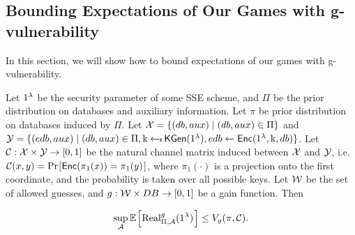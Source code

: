 \subsection{Bounding Expectations of Our Games with g-vulnerability}
In this section, we will show how to bound expectations of our games with g-vulnerability.

\begin{theorem}
	\normalfont
	Let $1^{\lambda}$ be the security parameter of some SSE scheme, and $\Pi$ be the prior distribution on databases and auxiliary information. Let $\pi$ be prior distribution on databases induced by $\Pi$. Let $\mathcal{X} = \{ (db, aux) \mid (db, aux) \in \Pi \}$ and $\mathcal{Y} = \{(edb, aux) \mid (db, aux) \in \Pi, \text{k} \hskip2.3pt{\gets\!\!\mbox{\tiny${\$}$\normalsize}}\, \mathsf{KGen}(1^{\lambda}), edb \gets \mathsf{Enc}(1^{\lambda}, \text{k}, db) \}$. Let $\mathcal{C}: \mathcal{X} \times \mathcal{Y} \rightarrow [0,1]$ be the natural channel matrix induced between $\mathcal{X}$ and $\mathcal{Y}$, i.e. $\channel(x,y) = \prob{\enc(\pi_1(x)) = \pi_1(y)}$, where $\pi_1(\cdot)$ is a projection onto the first coordinate, and the probability is taken over all possible keys. Let $\mathcal{W}$ be the set of allowed guesses, and $g:\mathcal{W} \times DB \rightarrow [0,1]$ be a gain function. Then
	
	\begin{equation*}
		\sup_{\adversary} \expect{\text{Real}_{\Pi, \adversary}^{g}(\secparam)} \leq V_{g}(\pi, \channel).
	\end{equation*}
\end{theorem}


